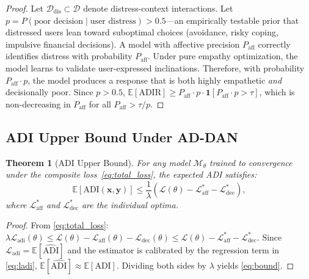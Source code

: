 \documentclass[lettersize,journal]{IEEEtran}
\newtheorem{theorem}{Theorem}
\begin{document}
\begin{proof}
Let $\mathcal{D}_\mathrm{dis}\subset\mathcal{D}$ denote distress-context
interactions.  Let $p = P(\text{poor decision} \mid \text{user distress})
> 0.5$—an empirically testable prior that distressed users lean toward suboptimal
choices (avoidance, risky coping, impulsive financial decisions).
A model with affective precision $P_\mathrm{aff}$ correctly identifies
distress with probability $P_\mathrm{aff}$.  Under pure empathy
optimization, the model learns to validate user-expressed inclinations.
Therefore, with probability $P_\mathrm{aff}\cdot p$, the model produces
a response that is both highly empathetic \emph{and} decisionally poor.
Since $p>0.5$,
$\mathbb{E}[\mathrm{ADIR}]\ge P_\mathrm{aff}\cdot p\cdot
 \mathbf{1}[P_\mathrm{aff}\cdot p>\tau]$,
which is non-decreasing in $P_\mathrm{aff}$ for all
$P_\mathrm{aff}>\tau/p$.
\end{proof}

\subsection{ADI Upper Bound Under AD-DAN}

\begin{theorem}[ADI Upper Bound]
\label{thm:adibound}
For any model $\mathcal{M}_\theta$ trained to convergence under the
composite loss~\eqref{eq:total_loss}, the expected ADI satisfies:
\begin{equation}
\mathbb{E}[\mathrm{ADI}(\mathbf{x},\mathbf{y})]
  \le \frac{1}{\lambda}\!\left(
        \mathcal{L}(\theta)
        - \mathcal{L}_\mathrm{aff}^*
        - \mathcal{L}_\mathrm{dec}^*
      \right),
\label{eq:bound}
\end{equation}
where $\mathcal{L}_\mathrm{aff}^*$ and $\mathcal{L}_\mathrm{dec}^*$ are the
individual optima.
\end{theorem}

\begin{proof}
From \eqref{eq:total_loss}:
$\lambda\mathcal{L}_\mathrm{adi}(\theta)
 \le \mathcal{L}(\theta)-\mathcal{L}_\mathrm{aff}(\theta)-\mathcal{L}_\mathrm{dec}(\theta)
 \le \mathcal{L}(\theta)-\mathcal{L}_\mathrm{aff}^*-\mathcal{L}_\mathrm{dec}^*$.
Since $\mathcal{L}_\mathrm{adi}=\mathbb{E}[\widehat{\mathrm{ADI}}]$ and the
estimator is calibrated by the regression term in \eqref{eq:ladi},
$\mathbb{E}[\widehat{\mathrm{ADI}}]\approx\mathbb{E}[\mathrm{ADI}]$.
Dividing both sides by $\lambda$ yields \eqref{eq:bound}.
\end{proof}
\end{document}
